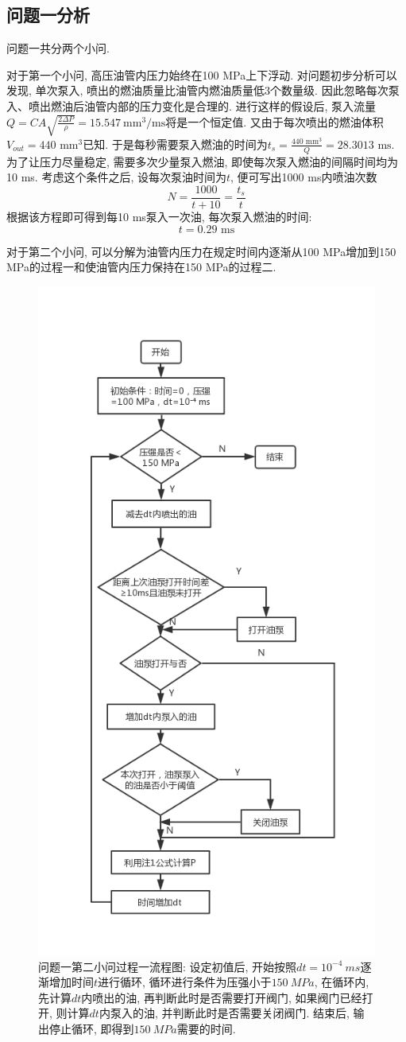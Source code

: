 \documentclass{cumcmthesis}
\begin{document}
\subsection{问题一分析}
问题一共分两个小问. 

对于第一个小问, 高压油管内压力始终在100 MPa上下浮动. 对问题初步分析可以发现, 单次泵入, 喷出的燃油质量比油管内燃油质量低3个数量级. 因此忽略每次泵入、喷出燃油后油管内部的压力变化是合理的. 进行这样的假设后, 泵入流量$Q = CA\sqrt{\frac{2\Delta P}{\rho}} = 15.547\ \text{mm}^3/\text{ms}$将是一个恒定值. 又由于每次喷出的燃油体积$V_{out} = 440\text{ mm}^3$已知. 于是每秒需要泵入燃油的时间为$t_{s} = \frac{440\text{ mm}^3}{Q} = 28.3013\text{ ms}$. 为了让压力尽量稳定, 需要多次少量泵入燃油, 即使每次泵入燃油的间隔时间均为10 ms. 考虑这个条件之后, 设每次泵油时间为$t$, 便可写出1000 ms内喷油次数
$$N = \frac{1000}{t+10}=\frac{t_s}{t}$$
根据该方程即可得到每10 ms泵入一次油, 每次泵入燃油的时间:
$$\boxed{t = 0.29\text{ ms}}$$ 

对于第二个小问, 可以分解为油管内压力在规定时间内逐渐从100 MPa增加到150 MPa的过程一和使油管内压力保持在150 MPa的过程二. 

\begin{figure}[htbp]
    \centering
    \includegraphics[width = 0.5\linewidth]{q1.jpg}
    \caption{问题一第二小问过程一流程图: 设定初值后, 开始按照$dt = 10^{-4}\ ms$逐渐增加时间$t$进行循环, 循环进行条件为压强小于$150\ MPa$, 在循环内, 先计算$dt$内喷出的油, 再判断此时是否需要打开阀门, 如果阀门已经打开, 则计算$dt$内泵入的油, 并判断此时是否需要关闭阀门. 结束后, 输出停止循环, 即得到$150\ MPa$需要的时间. }
    \label{121}
\end{figure}
\end{document}
